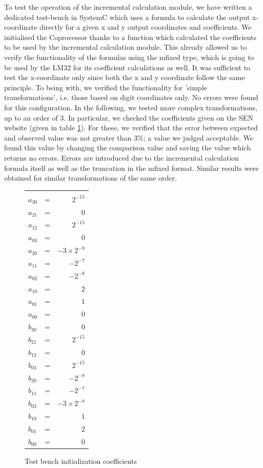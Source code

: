 To test the operation of the incremental calculation module, we have written a dedicated test-bench in SystemC which uses a formula to calculate the output x-coordinate directly for a given x and y output coordinates and coefficients.
We initialised the Coprocessor thanks to a function which calculated the coefficients to be used by the incremental calculation module. 
This already allowed us to verify the functionality of the formulas using the mfixed type, which is going to be used by the LM32 for its coefficient calculations as well.
It was sufficient to test the x-coordinate only since both the x and y coordinate follow the same principle. To being with, we verified the functionality for 'simple transformations', i.e. those based on digit coordinates only. No errors were found for this configuration. In the following, we tested more complex transformations, up to an order of 3. In particular, we checked the coefficients given on the SEN website (given in table \ref{coeff}). For these, we verified that the error between expected and observed value was not greater than 3\%; a value we judged acceptable. We found this value by changing the comparison value and saving the value which returns no errors. Errors are introduced due to the incremental calculation formula itself as well as the truncation in the mfixed format. Similar results were obtained for similar transformations of the same order.
\begin{figure}[H]
\center
\begin{tabular}{lcr}
&	&	\\
$a_{30}$ &=& $2^{-15}$ \\
$a_{21}$ &=& $0$ \\
$a_{12}$ &=& $2^{-15}$ \\
$a_{03}$ &=& $0$ \\
$a_{20}$ &=& $-3\times2^{-8}$ \\
$a_{11}$ &=& $-2^{-7}$ \\
$a_{02}$ &=& $-2^{-8}$ \\
$a_{10}$ &=& $2$ \\
$a_{01}$ &=& $1$ \\
$a_{00}$ &=& $0$ \\
$b_{30}$ &=& $0$ \\
$b_{21}$ &=& $2^{-15}$ \\
$b_{12}$ &=& $0$ \\
$b_{03}$ &=& $2^{-15}$ \\
$b_{20}$ &=& $-2^{-8}$ \\
$b_{11}$ &=& $-2^{-7}$ \\
$b_{02}$ &=& $-3\times 2^{-8}$ \\
$b_{10}$ &=& $1$ \\
$b_{01}$ &=& $2$ \\
$b_{00}$ &=& $0$ \\
\end{tabular}
\caption{Test bench initialization coefficients}
\label{coeff}
\end{figure}
